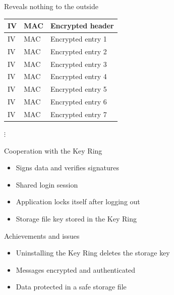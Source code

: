 \documentclass{beamer}
\newcommand*\tick{\item[\ding{51}]}
\newcommand*\fail{\item[\ding{55}]}
\begin{document}
\begin{frame}{Reveals nothing to the outside}
	\begin{tabularx}{\textwidth}{ |l|l|L| }
		\hline
		IV & MAC & Encrypted header \\
		\hline
		IV & MAC & Encrypted entry 1 \\
		\hline
		IV & MAC & Encrypted entry 2 \\
		\hline
		IV & MAC & Encrypted entry 3 \\
		\hline
		IV & MAC & Encrypted entry 4 \\
		\hline
		IV & MAC & Encrypted entry 5 \\
		\hline
		IV & MAC & Encrypted entry 6 \\
		\hline
		IV & MAC & Encrypted entry 7 \\
		\hline
	\end{tabularx}

	\centering
	$\vdots$ \\
\end{frame}


\begin{frame}{Cooperation with the Key Ring}
	\begin{itemize}
		\item{Signs data and verifies signatures}
		\item{Shared login session}
		\item{Application locks itself after logging out}
		\item{Storage file key stored in the Key Ring}
	\end{itemize}
\end{frame}


\begin{frame}{Achievements and issues}
	\begin{itemize}
		\fail Uninstalling the Key Ring deletes the storage key
		\tick Messages encrypted and authenticated
		\tick Data protected in a safe storage file
 	\end{itemize}
\end{frame}
\end{document}
